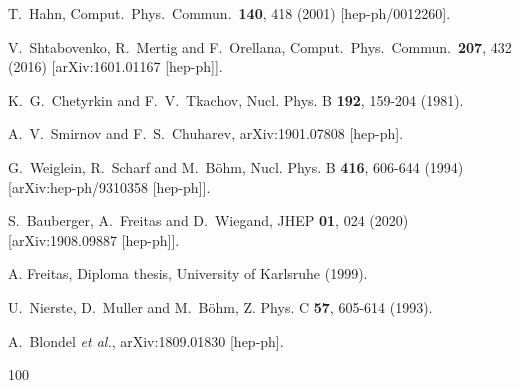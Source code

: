 \documentclass[Physsubmission, Phys]{SciPost}
\begin{document}
\begin{thebibliography}{100}
  T.~Hahn,
  Comput.\ Phys.\ Commun.\  {\bf 140}, 418 (2001)
  [hep-ph/0012260].

  V.~Shtabovenko, R.~Mertig and F.~Orellana,
  Comput.\ Phys.\ Commun.\  {\bf 207}, 432 (2016)
  [arXiv:1601.01167 [hep-ph]].
  
K.~G.~Chetyrkin and F.~V.~Tkachov,
Nucl. Phys. B \textbf{192}, 159-204 (1981).

A.~V.~Smirnov and F.~S.~Chuharev,
arXiv:1901.07808 [hep-ph].

G.~Weiglein, R.~Scharf and M.~B\"ohm,
Nucl. Phys. B \textbf{416}, 606-644 (1994)
[arXiv:hep-ph/9310358 [hep-ph]].

S.~Bauberger, A.~Freitas and D.~Wiegand,
JHEP \textbf{01}, 024 (2020)
[arXiv:1908.09887 [hep-ph]].

A. Freitas, Diploma thesis, University of Karlsruhe (1999).


U.~Nierste, D.~Muller and M.~B\"ohm,
Z. Phys. C \textbf{57}, 605-614 (1993).

A.~Blondel \textit{et al.},
arXiv:1809.01830 [hep-ph].

\end{thebibliography}{100}
\end{document}

